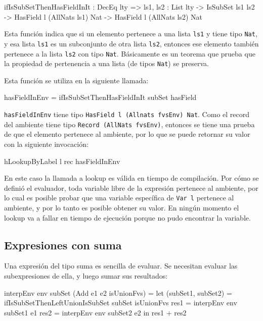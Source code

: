 \begin{code}
ifIsSubSetThenHasFieldInIt : DecEq lty => {ls1, ls2 : List lty} ->
  IsSubSet ls1 ls2 -> HasField l (AllNats ls1) Nat ->
  HasField l (AllNats ls2) Nat
\end{code}

Esta función indica que si un elemento pertenece a una lista \texttt{ls1} y tiene tipo \texttt{Nat}, y esa lista \texttt{ls1} es un subconjunto de otra lista \texttt{ls2}, entonces ese elemento también pertenece a la lista \texttt{ls2} con tipo \texttt{Nat}. Básicamente es un teorema que prueba que la propiedad de pertenencia a una lista (de tipos \texttt{Nat}) se preserva.

Esta función se utiliza en la siguiente llamada:

\begin{code}
hasFieldInEnv = ifIsSubSetThenHasFieldInIt subSet hasField
\end{code}

\texttt{hasFieldInEnv} tiene tipo \texttt{HasField l (Allnats fvsEnv) Nat}. Como el record del ambiente tiene tipo \texttt{Record (AllNats fvsEnv)}, entonces se tiene una prueba de que el elemento pertenece al ambiente, por lo que se puede retornar su valor con la siguiente invocación:

\begin{code}
hLookupByLabel l rec hasFieldInEnv
\end{code}

En este caso la llamada a lookup es válida en tiempo de compilación. Por cómo se definió el evaluador, toda variable libre de la expresión pertenece al ambiente, por lo cual es posible probar que una variable específica de \texttt{Var l} pertenece al ambiente, y por lo tanto es posible obtener su valor. En ningún momento el lookup va a fallar en tiempo de ejecución porque no pudo encontrar la variable.

\subsection{Expresiones con suma}

Una expresión del tipo suma es sencilla de evaluar. Se necesitan evaluar las subexpresiones de ella, y luego sumar sus resultados:

\begin{code}
interpEnv env subSet (Add e1 e2 isUnionFvs) =
  let (subSet1, subSet2) =
      ifIsSubSetThenLeftUnionIsSubSet subSet isUnionFvs
    res1 = interpEnv env subSet1 e1
    res2 = interpEnv env subSet2 e2
  in res1 + res2
\end{code}

